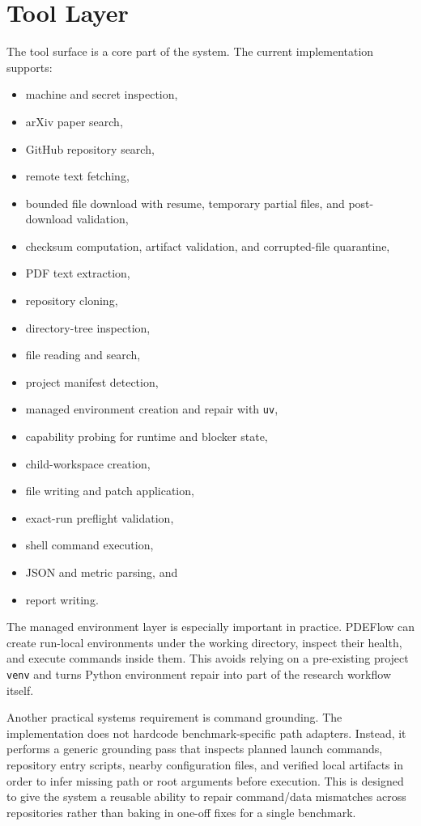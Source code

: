 \documentclass[11pt]{article}
\begin{document}
\section{Tool Layer}
The tool surface is a core part of the system. The current implementation supports:
\begin{itemize}[leftmargin=1.5em]
  \item machine and secret inspection,
  \item arXiv paper search,
  \item GitHub repository search,
  \item remote text fetching,
  \item bounded file download with resume, temporary partial files, and post-download validation,
  \item checksum computation, artifact validation, and corrupted-file quarantine,
  \item PDF text extraction,
  \item repository cloning,
  \item directory-tree inspection,
  \item file reading and search,
  \item project manifest detection,
  \item managed environment creation and repair with \texttt{uv},
  \item capability probing for runtime and blocker state,
  \item child-workspace creation,
  \item file writing and patch application,
  \item exact-run preflight validation,
  \item shell command execution,
  \item JSON and metric parsing, and
  \item report writing.
\end{itemize}

The managed environment layer is especially important in practice. PDEFlow can create run-local environments under the working directory, inspect their health, and execute commands inside them. This avoids relying on a pre-existing project \texttt{venv} and turns Python environment repair into part of the research workflow itself.

Another practical systems requirement is command grounding. The implementation does not hardcode benchmark-specific path adapters. Instead, it performs a generic grounding pass that inspects planned launch commands, repository entry scripts, nearby configuration files, and verified local artifacts in order to infer missing path or root arguments before execution. This is designed to give the system a reusable ability to repair command/data mismatches across repositories rather than baking in one-off fixes for a single benchmark.
\end{document}
